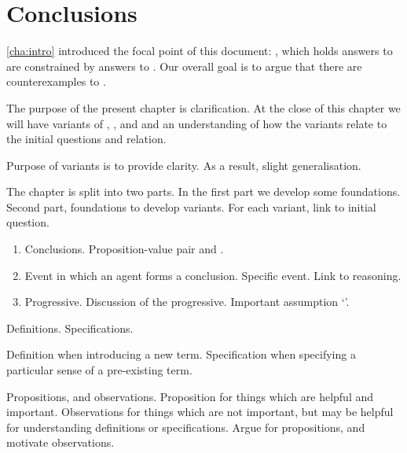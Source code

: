 \chapter{Conclusions}
\label{cha:clar}

\begin{note}
  \autoref{cha:intro} introduced the focal point of this document:
  \issueInclusion{}, which holds answers to \qWhy{} are constrained by answers to \qHow{}.
  Our overall goal is to argue that there are counterexamples to \issueInclusion{}.

  The purpose of the present chapter is clarification.
  At the close of this chapter we will have variants of \qWhy{}, \qHow{}, and \issueInclusion{} and an understanding of how the variants relate to the initial questions and relation.

  Purpose of variants is to provide clarity.
  As a result, slight generalisation.
\end{note}

\begin{note}
  The chapter is split into two parts.
  In the first part we develop some foundations.
  Second part, foundations to develop variants.
  For each variant, link to initial question.

  \begin{enumerate}[label=, leftmargin=0pt]
  \item

    Conclusions.
    Proposition-value pair and .
  \item

    Event in which an agent forms a conclusion.
    Specific event.
    Link to reasoning.
  \item

    Progressive.
    Discussion of the progressive.
    Important assumption `\assuPP{}'.
  \end{enumerate}
\end{note}

\begin{note}
  Definitions.
  Specifications.

  Definition when introducing a new term.
  Specification when specifying a particular sense of a pre-existing term.

  Propositions, and observations.
  Proposition for things which are helpful and important.
  Observations for things which are not important, but may be helpful for understanding definitions or specifications.
  Argue for propositions, and motivate observations.
\end{note}


